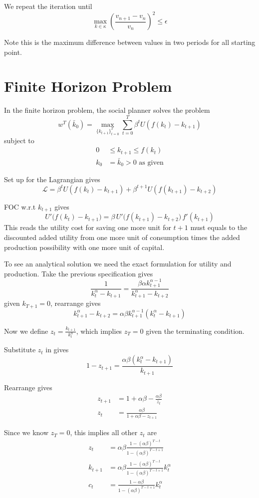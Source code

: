 \documentclass[twocolumn, fleqn]{article}
\begin{document}
	We repeat the iteration until
	\[\max_{k\in \kappa} \left(\frac{v_{n+1}-v_n}{v_n}\right)^2 \leq \epsilon\]
	
	Note this is the maximum difference between values in two periods for all starting point.
	
	\section{Finite Horizon Problem}
	
	In the finite horizon problem, the social planner solves the problem
	\[w^T(\bar{k}_0) = \max_{\{k_{t+1}\}_{t=0}^{T}} \sum_{t=0}^{T} \beta^t U(f(k_t)-k_{t+1})\]
	subject to 
	\begin{align*}
		0 &\leq k_{t+1} \leq f(k_t)\\
		k_0 &= \bar{k}_0 >0 \text{ as given}
	\end{align*}
	
	Set up for the Lagrangian gives
	\[\mathcal L = \beta^t U(f(k_t)-k_{t+1}) + \beta^{t+1}U(f(k_{t+1})-k_{t+2})\]
	
	FOC w.r.t $k_{t+1}$ gives 
	\[
	U'\bigl(f(k_t) - k_{t+1}\bigr) = \beta\,U'\bigl(f(k_{t+1}) - k_{t+2}\bigr)\,f'(k_{t+1})
	\]
	This reads the utility cost for saving one more unit for $t+1$ must equals to the discounted added utility from one more unit of consumption times the added production possibility with one more unit of capital.
	
	To see an analytical solution we need the exact formulation for utility and production. Take the previous specification gives 
	\[
	\frac{1}{k_t^\alpha - k_{t+1}} = \frac{\beta \alpha k_{t+1}^{\alpha-1}}{k_{t+1}^\alpha - k_{t+2}}
	\]
	given $k_{T+1}=0$, rearrange gives
	\[
	k_{t+1}^\alpha - k_{t+2} = \alpha \beta k_{t+1}^{\alpha-1} \left( k_t^\alpha - k_{t+1} \right)
	\]
	
	Now we define $z_t = \frac{k_{t+1}}{k_t^\alpha}$, which implies $z_T=0$ given the terminating condition.
	
	Substitute $z_t$ in gives 
	\[
	1 - z_{t+1} = \frac{\alpha \beta (k_t^\alpha - k_{t+1})}{k_{t+1}}\]
	
	Rearrange gives
	\begin{align*}
		z_{t+1} &= 1 + \alpha \beta - \frac{\alpha \beta}{z_t}\\
		z_t &= \frac{\alpha \beta}{1 + \alpha \beta - z_{t+1}}
	\end{align*}
	
	Since we know $z_T=0$, this implies all other $z_t$ are
	\begin{align*}
	z_t &= \alpha \beta \frac{1 - (\alpha \beta)^{T-t}}{1 - (\alpha \beta)^{T-t+1}} \\
	k_{t+1} &= \alpha \beta \frac{1 - (\alpha \beta)^{T-t}}{1 - (\alpha \beta)^{T-t+1}} k_t^\alpha \\
	c_t &= \frac{1 - \alpha \beta}{1 - (\alpha \beta)^{T-t+1}} k_t^\alpha
	\end{align*}
	
\end{document}
